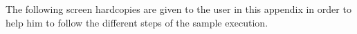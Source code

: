 %
%
%
%
%
%
%
%
%
%
The following screen hardcopies are given to the user in this appendix in 
order to help him to follow the different steps of the sample execution.



